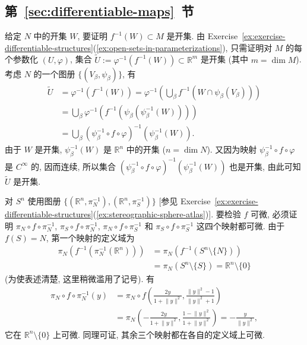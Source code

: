 \subsection{\texorpdfstring{第~\ref{sec:differentiable-maps}~节}{可微映射}}\label{subsec:solutions-differentiable-maps}

\begin{description}[font=\normalfont,leftmargin=2em,labelwidth=1.5em]
给定 $N$ 中的开集 $W$, 要证明 $f^{-1}(W)\subset M$ 是开集. 由 Exercise~\ref{ex:exercise-differentiable-structures}(\ref{ex:open-sets-in-parameterizations}), 只需证明对 $M$ 的每个参数化 $(U,\varphi)$, 集合 $\widetilde U:=\varphi^{-1}(f^{-1}(W))\subset\mathbb{R}^m$ 是开集 (其中 $m=\dim M$). 考虑 $N$ 的一个图册 $\{(V_\beta,\psi_\beta)\}$, 有
\begin{align*}
  \widetilde U
  &=\varphi^{-1}(f^{-1}(W))
  =\varphi^{-1}\left(\bigcup_\beta f^{-1}(W\cap\psi_\beta(V_\beta))\right)\\
  &=\bigcup_\beta\varphi^{-1}\left(f^{-1}\left(\psi_\beta\left(\psi_\beta^{-1}(W)\right)\right)\right)\\
  &=\bigcup_\beta(\psi_\beta^{-1}\circ f\circ\varphi)^{-1}\left(\psi_\beta^{-1}(W)\right).
\end{align*}
由于 $W$ 是开集, $\psi_\beta^{-1}(W)$ 是 $\mathbb{R}^n$ 中的开集 ($n=\dim N$). 又因为映射 $\psi_\beta^{-1}\circ f\circ\varphi$ 是 $C^\infty$ 的, 因而连续, 所以集合 $(\psi_\beta^{-1}\circ f\circ\varphi)^{-1}(\psi_\beta^{-1}(W))$ 也是开集, 由此可知 $\widetilde U$ 是开集.

对 $S^n$ 使用图册 $\{(\mathbb{R}^n,\pi_N^{-1}),(\mathbb{R}^n,\pi_S^{-1})\}$ [参见 Exercise~\ref{ex:exercise-differentiable-structures}(\ref{ex:stereographic-sphere-atlas})]. 要检验 $f$ 可微, 必须证明 $\pi_N\circ f\circ\pi_N^{-1}$, $\pi_S\circ f\circ\pi_N^{-1}$, $\pi_N\circ f\circ\pi_S^{-1}$ 和 $\pi_S\circ f\circ\pi_S^{-1}$ 这四个映射都可微. 由于 $f(S)=N$, 第一个映射的定义域为
\begin{align*}
  \pi_N(f^{-1}(\pi_N^{-1}(\mathbb{R}^n)))
  &=\pi_N(f^{-1}(S^n\setminus\{N\}))\\
  &=\pi_N(S^n\setminus\{S\})=\mathbb{R}^n\setminus\{0\}
\end{align*}
(为使表述清楚, 这里稍微滥用了记号). 有
\begin{align*}
  \pi_N\circ f\circ\pi_N^{-1}(y)
  &=\pi_N\circ f\left(\frac{2y}{1+\lVert y\rVert^2},\frac{\lVert y\rVert^2-1}{\lVert y\rVert^2+1}\right)\\
  &=\pi_N\left(-\frac{2y}{1+\lVert y\rVert^2},\frac{1-\lVert y\rVert^2}{1+\lVert y\rVert^2}\right)
  =-\frac{y}{\lVert y\rVert^2},
\end{align*}
它在 $\mathbb{R}^n\setminus\{0\}$ 上可微. 同理可证, 其余三个映射都在各自的定义域上可微.


\end{description}
